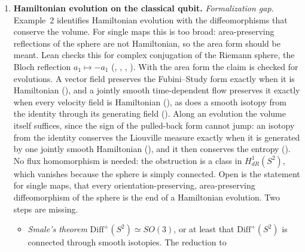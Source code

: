 \documentclass[11pt]{article}
\begin{document}
\begin{enumerate}
  Proposed: read ``the ensembles with support in $A$'' as the ensembles of the two-level system
  $A$ itself, CST on the sphere $P(A)$ with its own Liouville measure against QE-DENS on $A$, and
  state the premise that CST and QE-DENS hold for every quantum system, including the subsystem
  $A$. The proof is then the case $\dim\mathcal H = 2$, which is checked, and it covers every
  $\mathcal H$ with $\dim\mathcal H \ge 2$, also infinite-dimensional ones, without the ``only
  if'' of Theorem~1. The alternative is to compare the whole spaces as in Lean and keep
  $\dim\mathcal H < \infty$ from Theorem~1, which is checked.
\item \textbf{Hamiltonian evolution on the classical qubit.} \emph{Formalization gap.} Example~2 identifies Hamiltonian
  evolution with the diffeomorphisms that conserve the volume. For single maps this is too broad:
  area-preserving reflections of the sphere are not Hamiltonian, so the area form should be
  meant. Lean checks this for complex
  conjugation of the Riemann sphere, the Bloch reflection $a_1 \mapsto -a_1$
  (, ,
  , ). With the area form the
  claim is checked for
  evolutions. A vector field preserves the Fubini--Study form exactly when it is Hamiltonian
  (), and a jointly smooth time-dependent flow
  preserves it exactly when every velocity field is Hamiltonian
  (), as does a smooth isotopy from the identity through
  its generating field (). Along an evolution
  the volume itself suffices, since the sign of the pulled-back form cannot jump: an isotopy from
  the identity conserves the Liouville measure exactly when it is generated by one jointly smooth
  Hamiltonian (), and it then conserves the entropy
  (). No flux homomorphism
  is needed: the obstruction is a class in $H^1_{dR}(S^2)$, which vanishes because the sphere is
  simply connected. Open is the
  statement for single maps, that every orientation-preserving, area-preserving diffeomorphism of
  the sphere is the end of a Hamiltonian evolution. Two steps are missing.
  \begin{itemize}
  \item \emph{Smale's theorem} $\mathrm{Diff}^+(S^2) \simeq SO(3)$, or at least that
    $\mathrm{Diff}^+(S^2)$ is connected through smooth isotopies. The reduction to

\end{itemize}
\end{enumerate}
\end{document}
